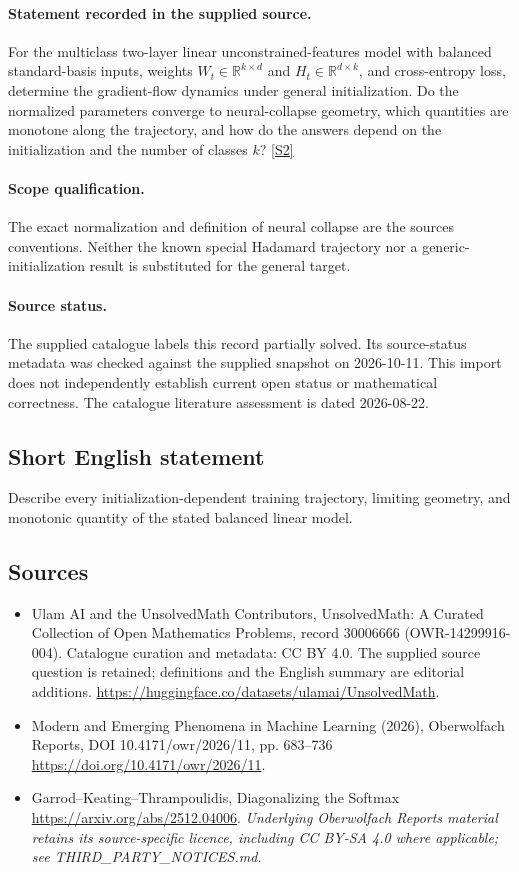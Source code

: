 \documentclass[11pt]{article}
\begin{document}
\paragraph{Statement recorded in the supplied source.}
For the multiclass two-layer linear unconstrained-features model with balanced standard-basis inputs, weights $W_t\in\mathbb R^{k\times d}$ and $H_t\in\mathbb R^{d\times k}$, and cross-entropy loss, determine the gradient-flow dynamics under general initialization. Do the normalized parameters converge to neural-collapse geometry, which quantities are monotone along the trajectory, and how do the answers depend on the initialization and the number of classes $k$? \href{https://doi.org/10.4171/owr/2026/11}{[S2]}
\paragraph{Scope qualification.}
The exact normalization and definition of neural collapse are the source\textquotesingle s conventions. Neither the known special Hadamard trajectory nor a generic-initialization result is substituted for the general target.
\paragraph{Source status.}
The supplied catalogue labels this record partially solved. Its source-status metadata was checked against the supplied snapshot on 2026-10-11. This import does not independently establish current open status or mathematical correctness. The catalogue literature assessment is dated 2026-08-22.
\subsection{Short English statement}
Describe every initialization-dependent training trajectory, limiting geometry, and monotonic quantity of the stated balanced linear model.
\subsection{Sources}
\begin{itemize}
\item[S1] Ulam AI and the UnsolvedMath Contributors, UnsolvedMath: A Curated Collection of Open Mathematics Problems, record 30006666 (OWR-14299916-004). Catalogue curation and metadata: CC BY 4.0. The supplied source question is retained; definitions and the English summary are editorial additions.
\url{https://huggingface.co/datasets/ulamai/UnsolvedMath}.
\item[S2] Modern and Emerging Phenomena in Machine Learning (2026), Oberwolfach Reports, DOI 10.4171/owr/2026/11, pp. 683--736
\url{https://doi.org/10.4171/owr/2026/11}.
\item[S3] Garrod--Keating--Thrampoulidis, Diagonalizing the Softmax
\url{https://arxiv.org/abs/2512.04006}.
\textit{Underlying Oberwolfach Reports material retains its source-specific licence, including CC BY-SA 4.0 where applicable; see THIRD\_PARTY\_NOTICES.md.}
\end{itemize}
\end{document}
